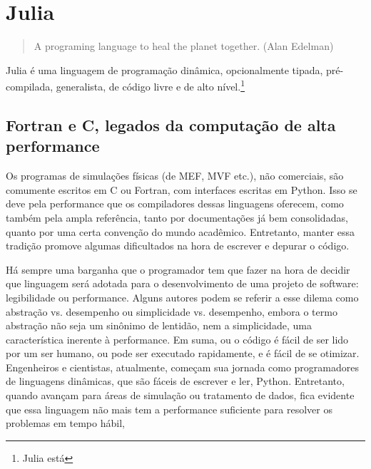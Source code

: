 \chapter{Julia}

\begin{quotation}
    A programing language to heal the planet together.
    (Alan Edelman)
\end{quotation}

Julia é uma linguagem de programação dinâmica, opcionalmente tipada, pré-compilada, generalista, de código livre e de alto nível.\footnote[]{Julia está }\cite[The scope of Julia]{Sherrington}




\section{Fortran e C, legados da computação de alta performance}

Os programas de simulações físicas (de MEF, MVF etc.), não comerciais, são comumente escritos em C ou Fortran, com interfaces escritas em Python. Isso se deve pela performance que os compiladores dessas linguagens oferecem, como também pela ampla referência, tanto por documentações já bem consolidadas, quanto por uma certa convenção do mundo acadêmico. Entretanto, manter essa tradição promove algumas dificultados na hora de escrever e depurar o código.


Há sempre uma barganha que o programador tem que fazer na hora de decidir que linguagem será adotada para o desenvolvimento de uma projeto de software: legibilidade ou performance. Alguns autores podem se referir a esse dilema como abstração vs. desempenho ou simplicidade vs. desempenho, embora o termo abstração não seja um sinônimo de lentidão, nem a simplicidade, uma característica inerente à performance. Em suma, ou o código é fácil de ser lido por um ser humano, ou pode ser executado rapidamente, e é fácil de se otimizar. Engenheiros e cientistas, atualmente, começam sua jornada como programadores de linguagens dinâmicas, que são fáceis de escrever e ler, Python. Entretanto, quando avançam para áreas de simulação ou tratamento de dados, fica evidente que essa linguagem não mais tem a performance suficiente para resolver os problemas em tempo hábil,

